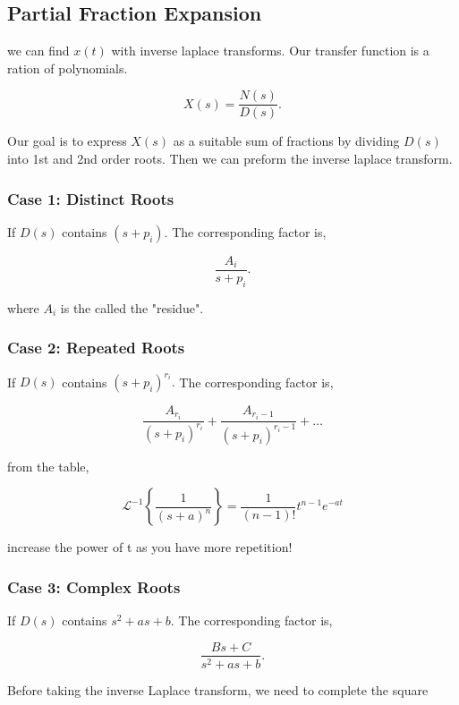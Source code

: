 \documentclass[12pt, a4paper]{report}
\begin{document}
  \subsection{Partial Fraction Expansion}
  we can find $ x(t) $ with inverse laplace transforms. Our transfer function is a ration of polynomials.

  \[
      X(s) = \frac{N(s)}{D(s)}
    .\]

  \noindent

  Our goal is to express $ X(s)$ as a suitable sum of fractions by dividing $ D(s) $ into 1st and 2nd order roots. Then we can preform the inverse laplace transform.

  \subsubsection{Case 1: Distinct Roots}

  If $ D(s) $ contains $ (s + p_i). $ The corresponding factor is,

  \[
      \frac{A_i}{s + p_i}
    .\]

  where $ A_i $ is the called the "residue".

  \subsubsection{Case 2: Repeated Roots}

  If $ D(s) $ contains $ (s + p_i)^{r_i}. $ The corresponding factor is,

  \[
      \frac{A_{r_i}}{ \left( s + p_i \right)^{r_i} } + \frac{A_{r_i-1}}{ \left( s + p_i \right)^{r_{i}-1} } + \ldots
    \]

  from the table,

  \begin{equation}
    \mathcal{L}^{-1}\left\{\frac{1}{(s+a)^n}\right\} = \frac{1}{(n-1)!}t^{n-1}e^{-at}
  \end{equation}

  increase the power of t as you have more repetition!

  \subsubsection{Case 3: Complex Roots}

  If $ D(s) $ contains $ s ^2 + as + b. $ The corresponding factor is,

  \[
      \frac{Bs + C}{s ^2 + as + b}
    .\]

  Before taking the inverse Laplace transform, we need to complete the square
\end{document}
